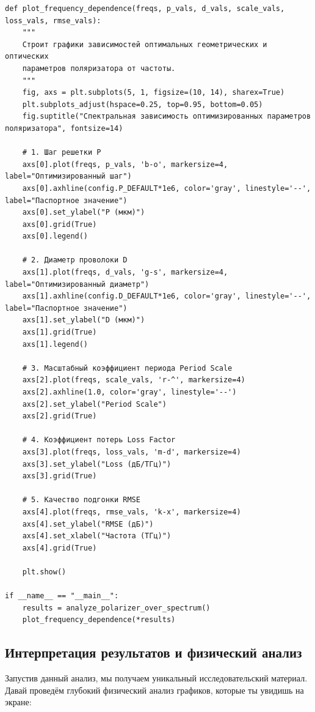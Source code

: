 \begin{verbatim}
def plot_frequency_dependence(freqs, p_vals, d_vals, scale_vals, loss_vals, rmse_vals):
    """
    Строит графики зависимостей оптимальных геометрических и оптических 
    параметров поляризатора от частоты.
    """
    fig, axs = plt.subplots(5, 1, figsize=(10, 14), sharex=True)
    plt.subplots_adjust(hspace=0.25, top=0.95, bottom=0.05)
    fig.suptitle("Спектральная зависимость оптимизированных параметров поляризатора", fontsize=14)
    
    # 1. Шаг решетки P
    axs[0].plot(freqs, p_vals, 'b-o', markersize=4, label="Оптимизированный шаг")
    axs[0].axhline(config.P_DEFAULT*1e6, color='gray', linestyle='--', label="Паспортное значение")
    axs[0].set_ylabel("P (мкм)")
    axs[0].grid(True)
    axs[0].legend()
    
    # 2. Диаметр проволоки D
    axs[1].plot(freqs, d_vals, 'g-s', markersize=4, label="Оптимизированный диаметр")
    axs[1].axhline(config.D_DEFAULT*1e6, color='gray', linestyle='--', label="Паспортное значение")
    axs[1].set_ylabel("D (мкм)")
    axs[1].grid(True)
    axs[1].legend()
    
    # 3. Масштабный коэффициент периода Period Scale
    axs[2].plot(freqs, scale_vals, 'r-^', markersize=4)
    axs[2].axhline(1.0, color='gray', linestyle='--')
    axs[2].set_ylabel("Period Scale")
    axs[2].grid(True)
    
    # 4. Коэффициент потерь Loss Factor
    axs[3].plot(freqs, loss_vals, 'm-d', markersize=4)
    axs[3].set_ylabel("Loss (дБ/ТГц)")
    axs[3].grid(True)
    
    # 5. Качество подгонки RMSE
    axs[4].plot(freqs, rmse_vals, 'k-x', markersize=4)
    axs[4].set_ylabel("RMSE (дБ)")
    axs[4].set_xlabel("Частота (ТГц)")
    axs[4].grid(True)
    
    plt.show()

if __name__ == "__main__":
    results = analyze_polarizer_over_spectrum()
    plot_frequency_dependence(*results)
\end{verbatim}

\subsection{Интерпретация результатов и физический анализ}

Запустив данный анализ, мы получаем уникальный исследовательский материал. Давай проведём глубокий физический анализ графиков, которые ты увидишь на экране:

